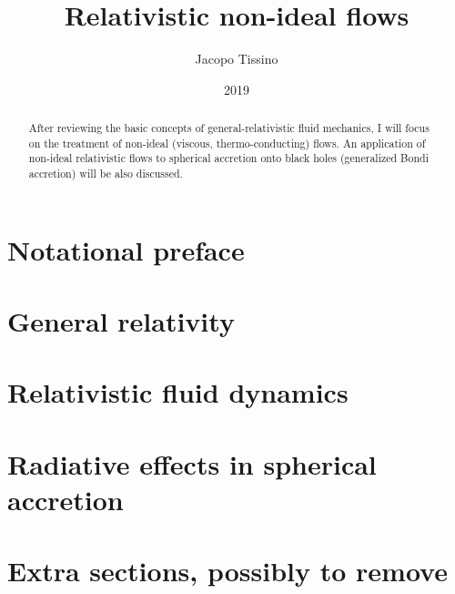 \documentclass[a4paper, 11pt]{article}
\title{Relativistic non-ideal flows}
\author{Jacopo Tissino}
\date{2019}
\begin{document}


\begin{abstract}
After reviewing the basic concepts of general-relativistic fluid mechanics, I will focus on the treatment of non-ideal
(viscous, thermo-conducting) flows. An application of non-ideal relativistic flows to spherical accretion onto black holes
(generalized Bondi accretion) will be also discussed.
\end{abstract}

\setcounter{tocdepth}{4}
\tableofcontents

\section{Notational preface} \label{sec:notational-preface}


\section{General relativity} \label{sec:general-relativity}


\section{Relativistic fluid dynamics} \label{sec:fluid-dynamics}


\section{Radiative effects in spherical accretion} \label{sec:radiative-effects}


\section{Extra sections, possibly to remove}


\printbibliography[title={Bibliography}]

\end{document}
